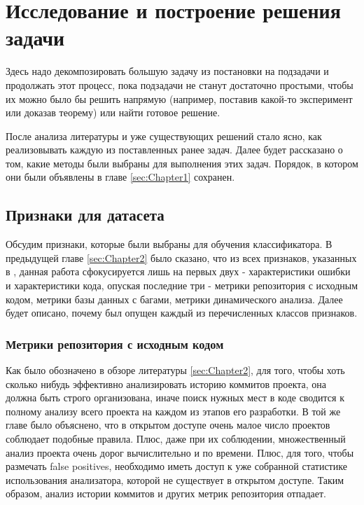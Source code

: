 \chapter{Исследование и построение решения задачи}
\label{sec:Chapter3} 

Здесь надо декомпозировать большую задачу из постановки на подзадачи и продолжать этот процесс, пока подзадачи не станут достаточно простыми, чтобы их можно было бы решить напрямую (например, поставив какой-то эксперимент или доказав теорему) или найти готовое решение.

После анализа литературы и уже существующих решений стало ясно, как реализовывать каждую из поставленных ранее задач. Далее будет рассказано о том, какие методы были выбраны для выполнения этих задач. Порядок, в котором они были объявлены в главе \ref{sec:Chapter1} сохранен.

\section{Признаки для датасета}

Обсудим признаки, которые были выбраны для обучения классификатора. В предыдущей главе \ref{sec:Chapter2} было сказано, что из всех признаков, указанных в \cite{HECKMAN2011363}, данная работа сфокусируется лишь на первых двух - характеристики ошибки и характеристики кода, опуская последние три - метрики репозитория с исходным кодом, метрики базы данных с багами, метрики динамического анализа. Далее будет описано, почему был опущен каждый из перечисленных классов признаков.

\subsection{Метрики репозитория с исходным кодом}
Как было обозначено в обзоре литературы \ref{sec:Chapter2}, для того, чтобы хоть сколько нибудь эффективно анализировать историю коммитов проекта, она должна быть строго организована, иначе поиск нужных мест в коде сводится к полному анализу всего проекта на каждом из этапов его разработки. В той же главе было объяснено, что в открытом доступе очень малое число проектов соблюдает подобные правила. Плюс, даже при их соблюдении, множественный анализ проекта очень дорог вычислительно и по времени. Плюс, для того, чтобы размечать false positives, необходимо иметь доступ к уже собранной статистике использования анализатора, которой не существует в открытом доступе. Таким образом, анализ истории коммитов и других метрик репозитория отпадает.

